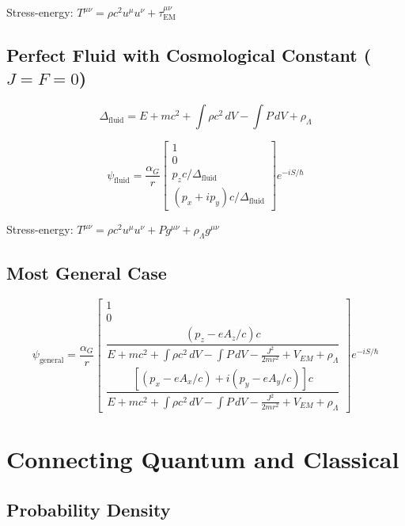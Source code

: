 \documentclass[11pt,a4paper]{article}
\theoremstyle{definition}
\theoremstyle{remark}
\begin{document}
	Stress-energy: $T^{\mu\nu} = \rho c^2 u^\mu u^\nu + \tau^{\mu\nu}_{\mathrm{EM}}$
	
	\subsection{Perfect Fluid with Cosmological Constant ($J=F=0$)}
	
	\begin{equation}
		\Delta_{\mathrm{fluid}} = E + mc^2 + \int\rho c^2\,dV - \int P\,dV + \rho_\Lambda
	\end{equation}
	
	\begin{equation}
		\psi_{\mathrm{fluid}} = \frac{\alpha_G}{r}\begin{bmatrix}1\\0\\ p_zc/\Delta_{\mathrm{fluid}}\\ (p_x+ip_y)c/\Delta_{\mathrm{fluid}}\end{bmatrix}e^{-iS/\hbar}
	\end{equation}
	
	Stress-energy: $T^{\mu\nu} = \rho c^2 u^\mu u^\nu + Pg^{\mu\nu} + \rho_\Lambda g^{\mu\nu}$
	
	\subsection{Most General Case}
	
	\begin{equation}
		\boxed{
			\psi_{\mathrm{general}} = \frac{\alpha_G}{r}\begin{bmatrix}
				1 \\ 0 \\
				\dfrac{(p_z-eA_z/c)c}{E+mc^2+\int\rho c^2\,dV-\int P\,dV-\frac{J^2}{2mr^2}+V_{EM}+\rho_\Lambda} \\[10pt]
				\dfrac{[(p_x-eA_x/c)+i(p_y-eA_y/c)]c}{E+mc^2+\int\rho c^2\,dV-\int P\,dV-\frac{J^2}{2mr^2}+V_{EM}+\rho_\Lambda}
			\end{bmatrix}e^{-iS/\hbar}
		}
	\end{equation}
	
	\section{Connecting Quantum and Classical}
	
	\subsection{Probability Density}
	
\end{document}
